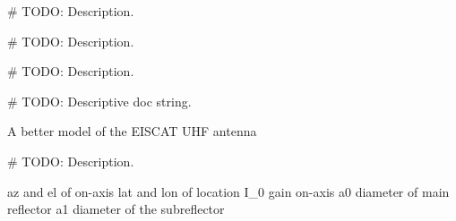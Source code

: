 \documentclass[letterpaper,10pt,english]{sphinxmanual}
\begin{document}

\begin{fulllineitems}
\label{\detokenize{modules/antenna_library:antenna_library.airy_beam}}
\# TODO: Description.

\end{fulllineitems}


\begin{fulllineitems}
\label{\detokenize{modules/antenna_library:antenna_library.array}}
\# TODO: Description.

\end{fulllineitems}


\begin{fulllineitems}
\label{\detokenize{modules/antenna_library:antenna_library.array_beam}}
\# TODO: Description.

\end{fulllineitems}


\begin{fulllineitems}
\label{\detokenize{modules/antenna_library:antenna_library.cassegrain}}
\# TODO: Descriptive doc string.

A better model of the EISCAT UHF antenna

\end{fulllineitems}


\begin{fulllineitems}
\label{\detokenize{modules/antenna_library:antenna_library.cassegrain_beam}}
\# TODO: Description.

az and el of on-axis
lat and lon of location
I\_0 gain on-axis
a0 diameter of main reflector
a1 diameter of the subreflector

\end{fulllineitems}
\end{document}
